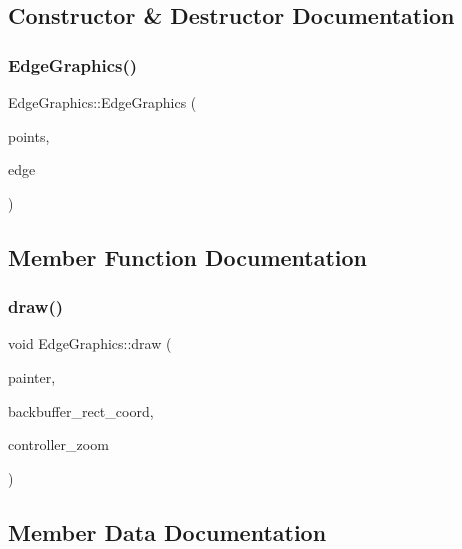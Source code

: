 \subsection{Constructor \& Destructor Documentation}
\mbox{\label{class_edge_graphics_a5d5e0e533ccdccd7e87fb09907ea9e34}} 
\subsubsection{\texorpdfstring{EdgeGraphics()}{EdgeGraphics()}}
{\footnotesize\ttfamily Edge\+Graphics\+::\+Edge\+Graphics (\begin{DoxyParamCaption}\item[{const std\+::vector$<$ qmapcontrol\+::\+Point\+World\+Coord $>$ \&}]{points,  }\item[{std\+::shared\+\_\+ptr$<$ \mbox{\hyperlink{struct_node_data_1_1_edge}{Node\+Data\+::\+Edge}} $>$}]{edge }\end{DoxyParamCaption})\hspace{0.3cm}{\ttfamily [explicit]}}



\subsection{Member Function Documentation}
\mbox{\label{class_edge_graphics_a033cd02547ab4e2733cfc1ecdfee8312}} 
\subsubsection{\texorpdfstring{draw()}{draw()}}
{\footnotesize\ttfamily void Edge\+Graphics\+::draw (\begin{DoxyParamCaption}\item[{Q\+Painter \&}]{painter,  }\item[{const qmapcontrol\+::\+Rect\+World\+Coord \&}]{backbuffer\+\_\+rect\+\_\+coord,  }\item[{const int \&}]{controller\+\_\+zoom }\end{DoxyParamCaption})\hspace{0.3cm}{\ttfamily [virtual]}}



\subsection{Member Data Documentation}
\mbox{\label{class_edge_graphics_a6fa3ef570ccaa725dec8c6686dbdb8bf}} 
